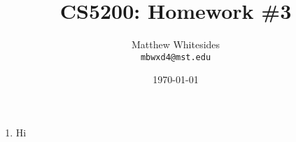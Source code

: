 \documentclass{article}
\title{CS5200: Homework \#3} %
\author{Matthew Whitesides\\ \texttt{mbwxd4@mst.edu}} %
\date{\today} %
\begin{document}
  \maketitle %
 
  \begin{enumerate}
    \item Hi
  \end{enumerate}
\end{document}
